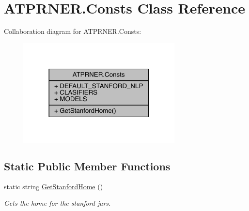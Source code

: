 \hypertarget{class_a_t_p_r_n_e_r_1_1_consts}{}\section{A\+T\+P\+R\+N\+E\+R.\+Consts Class Reference}
\label{class_a_t_p_r_n_e_r_1_1_consts}


Collaboration diagram for A\+T\+P\+R\+N\+E\+R.\+Consts\+:
\nopagebreak
\begin{figure}[H]
\begin{center}
\leavevmode
\includegraphics[width=234pt]{d8/dc9/class_a_t_p_r_n_e_r_1_1_consts__coll__graph}
\end{center}
\end{figure}
\subsection*{Static Public Member Functions}
\begin{DoxyCompactItemize}
\item 
static string \hyperlink{class_a_t_p_r_n_e_r_1_1_consts_ad399f9a954d0d35c77fdc899f1c47255}{Get\+Stanford\+Home} ()
\begin{DoxyCompactList}\small\item\em Gets the home for the stanford jars. \end{DoxyCompactList}\end{DoxyCompactItemize}
